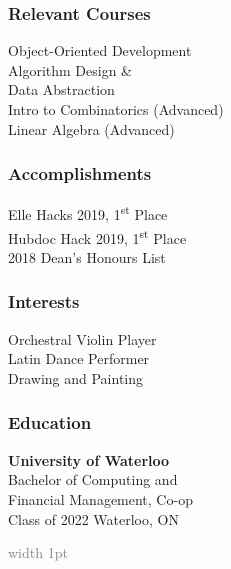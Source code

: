 \documentclass{mxresume}
\newcommand{\Bar}{\textbf{ }\textbar\textbf{ }}
\begin{document}
\begin{minipage}[t]{0.26\textwidth}
\begin{sidebar}
\subsubsection*{Relevant Courses}
Object-Oriented Development \\[1mm]
Algorithm Design \& \\
Data Abstraction \\[1mm]
Intro to Combinatorics (Advanced) \\[1mm]
Linear Algebra (Advanced)
\subsubsection*{Accomplishments}
Elle Hacks 2019, 1\textsuperscript{st} Place \\[1mm]
Hubdoc Hack 2019, 1\textsuperscript{st} Place \\[1mm]
2018 Dean's Honours List
\subsubsection*{Interests}
Orchestral Violin Player \\[1mm]
Latin Dance Performer \\[1mm]
Drawing and Painting
\subsubsection*{Education}
\textbf{University of Waterloo} \\[1mm]
Bachelor of Computing and \\
Financial Management, Co-op \\[1.5mm]
Class of 2022 \textcolor{gray}{\Bar} Waterloo, ON
\end{sidebar}
\hfill
\end{minipage}
%
\hfill\textcolor{gray}{\vline width 1pt}\hfill
\end{document}
